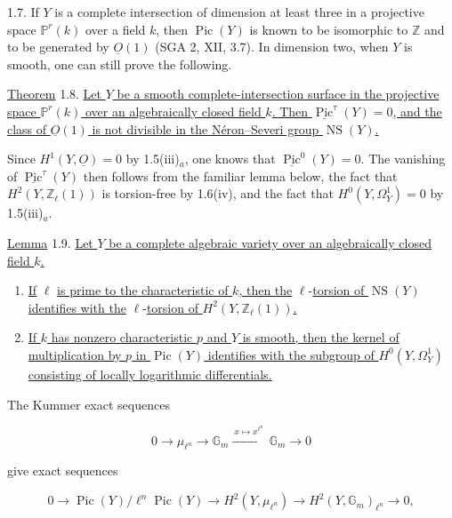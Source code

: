 1.7. If $Y$ is a complete intersection of dimension at least three in a
projective space $\mathbb P^r(k)$ over a field $k$, then
$\operatorname{Pic}(Y)$ is known to be isomorphic to $\mathbb Z$ and to be
generated by $\underline O(1)$ (SGA 2, XII, 3.7).  In dimension two, when
$Y$ is smooth, one can still prove the following.

\underline{Theorem} 1.8. \underline{Let $Y$ be a smooth complete-intersection
surface in the projective space $\mathbb P^r(k)$ over an algebraically
closed field $k$.  Then $\underline{\operatorname{Pic}}^\tau(Y)=0$, and the
class of $\underline O(1)$ is not divisible in the Néron--Severi group
$\operatorname{NS}(Y)$.}

Since $H^1(Y,\underline O)=0$ by 1.5(iii)$_a$, one knows that
$\underline{\operatorname{Pic}}^0(Y)=0$.  The vanishing of
$\underline{\operatorname{Pic}}^\tau(Y)$ then follows from the familiar
lemma below, the fact that $H^2(Y,\mathbb Z_\ell(1))$ is torsion-free by
1.6(iv), and the fact that $H^0(Y,\Omega_Y^1)=0$ by 1.5(iii)$_a$.

\underline{Lemma} 1.9. \underline{Let $Y$ be a complete algebraic variety
over an algebraically closed field $k$.}

\begin{enumerate}[label=(\roman*),leftmargin=2.6em]
\item \underline{If} $\ell$ \underline{is prime to the characteristic of $k$, then the}
$\ell$-\underline{torsion of $\operatorname{NS}(Y)$ identifies with the} $\ell$-\underline{torsion
of $H^2(Y,\mathbb Z_\ell(1))$.}


\item \underline{If $k$ has nonzero characteristic $p$ and $Y$ is smooth,
then the kernel of multiplication by $p$ in $\operatorname{Pic}(Y)$
identifies with the subgroup of $H^0(Y,\Omega_Y^1)$ consisting of locally
logarithmic differentials.}
\end{enumerate}

The Kummer exact sequences

\begin{equation*}
0\longrightarrow\mu_{\ell^n}\longrightarrow\mathbb G_m
\xrightarrow{\ x\mapsto x^{\ell^n}\ }\mathbb G_m\longrightarrow0
\end{equation*}

give exact sequences

\begin{equation*}
0\longrightarrow
\operatorname{Pic}(Y)/\ell^n\operatorname{Pic}(Y)
\longrightarrow H^2(Y,\mu_{\ell^n})
\longrightarrow H^2(Y,\mathbb G_m)_{\ell^n}
\longrightarrow0,
\end{equation*}


